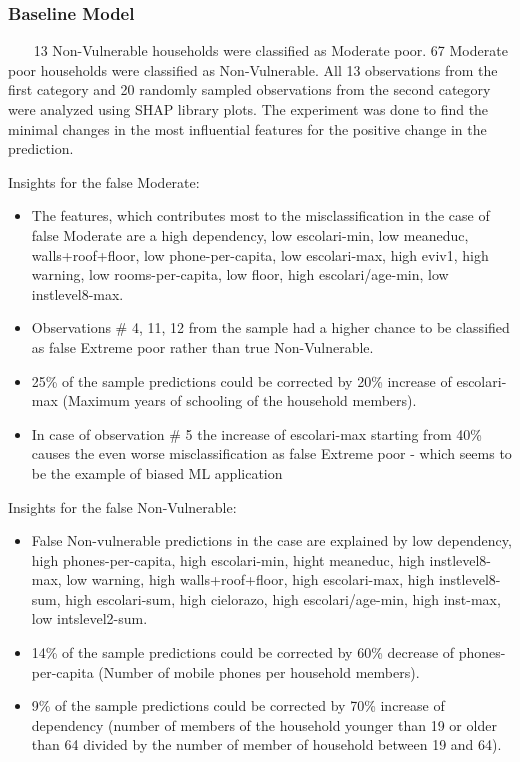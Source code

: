     \subsubsection{Baseline Model}~~~
        13 Non-Vulnerable households were classified as Moderate poor. 67 Moderate poor households were classified as Non-Vulnerable. All 13 observations from the first category and 20 randomly sampled observations from the second category were analyzed using SHAP library plots. The experiment was done to find the minimal changes in the most influential features for the positive change in the prediction.

        Insights for the false Moderate:
        \begin{itemize}
            \item The features, which contributes most to the misclassification in the case of false Moderate are a high dependency, low escolari-min, low meaneduc, walls+roof+floor, low phone-per-capita, low escolari-max, high eviv1, high warning, low rooms-per-capita, low floor, high escolari/age-min, low instlevel8-max. 
            \item Observations \# 4, 11, 12 from the sample had a higher chance to be classified as false Extreme poor rather than true Non-Vulnerable. 
            \item 25\% of the sample predictions could be corrected by 20\% increase of escolari-max (Maximum years of schooling of the household members). 
            \item In case of observation \# 5 the increase of escolari-max starting from 40\% causes the even worse misclassification as false Extreme poor - which seems to be the example of biased ML application
        \end{itemize}
        
        Insights for the false Non-Vulnerable:
        \begin{itemize}
            \item False Non-vulnerable predictions in the case are explained by low dependency, high phones-per-capita, high escolari-min, hight meaneduc, high instlevel8-max, low warning, high walls+roof+floor, high escolari-max, high instlevel8-sum, high escolari-sum, high cielorazo, high escolari/age-min, high inst-max, low intslevel2-sum.
            \item 14\% of the sample predictions could be corrected by 60\% decrease of phones-per-capita (Number of mobile phones per household members). 
            \item 9\% of the sample predictions could be corrected by 70\% increase of dependency (number of members of the household younger than 19 or older than 64 divided by the number of member of household between 19 and 64). 
        \end{itemize}
        
